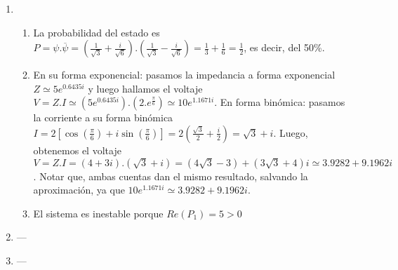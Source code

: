 \documentclass[a4paper]{article}
\newcommand{\exercise}{\item}
\newcommand{\df}[2]{\displaystyle\frac{#1}{#2}}
\newcommand{\conj}[1]{\overline{#1}}
\newcommand{\cis}[1]{\left[\cos\left({#1}\right)+i\sin\left({#1}\right)\right]}
\begin{document}
\begin{enumerate}
\begin{enumerate} [label=(\alph*)]
\item ---		\item Primero rotamos los puntos $90^{\circ}$ en sentido antihorario con la operación $w=z.e^{\frac{\pi}{2}i}=z.i$. Luego expandimos los puntos obtenidos con la operación $u=2.z.i=2i.z$. Los nuevos puntos obtenidos serán $a=-2$, $b=2i-2$, $c=0$ y $d=2i$.
		\item Notar que $Arg(z) = 60^{\circ}$ y queremos rotarlo para que esté orientado hace el eje $-x$, por lo que deberíamos rotarlo $120^{\circ}=\df{2}{3}\pi$. Para rotarlo debemos hacer la operación $w=z.e^{\frac{2\pi}{3}i} = \left(2e^{\frac{\pi}{3}i}\right).e^{\frac{2\pi}{3}i} =2e^{\pi i}=-2+0i$, que está exactamente al centro de la región pedida.
		\item Podemos escalar al complejo con la operación $u=kz=k+4ki$. Si queremos que se cumpla la condición límite $Im(u) = 2 - Re(u)$ debe pasar que $4k=2-k$, es decir, $k=2/5$. Por lo tanto, podremos utilizar valores de $k$ entre $0$ y $\df{2}{5}$. Se sugiere elegir algunos valores de $k$ para escalar al complejo y graficarlo junto con la región pedida.
		\item Notar que $Arg(3+i) \simeq 18.43^{\circ}$ y queremos rotarlo para que esté orientado hace el eje $-x$, por lo que deberíamos rotarlo alrededor de $160^{\circ}=\df{8}{9}\pi$ (no hace falta ser exactos ya que hay toda un área donde el complejo puede caer). Para rotarlo debemos hacer la operación $w=z.e^{\frac{8\pi}{9}i}\simeq \left(\sqrt{10}e^{0.3218 i}\right).e^{\frac{8\pi}{9}i}\simeq \sqrt{10}e^{3.1143 i} \simeq -3.1611 + 0.0864 i$, que gráficamente puede verse que comprueba lo pedido.
\end{enumerate}\exercise\begin{enumerate} [label=(\alph*)]		\item La probabilidad del estado es $P=\psi .\conj{\psi}=\left(\df{1}{\sqrt{3}}+\df{i}{\sqrt{6}}\right).\left(\df{1}{\sqrt{3}}-\df{i}{\sqrt{6}}\right)=\df{1}{3}+\df{1}{6}=\df{1}{2}$, es decir, del 50\%.
		\item En su forma exponencial: pasamos la impedancia a forma exponencial $Z \simeq 5e^{0.6435 i}$ y luego hallamos el voltaje $V=Z.I\simeq\left(5e^{0.6435 i}\right).\left(2.e^{\frac{\pi}{6}}\right)\simeq10e^{1.1671 i}$. En forma binómica: pasamos la corriente a su forma binómica $I=2\cis{\df{\pi}{6}}=2\left(\df{\sqrt{3}}{2}+\df{i}{2}\right)=\sqrt{3}+i$. Luego, obtenemos el voltaje $V=Z.I=(4+3i).(\sqrt{3}+i)=(4\sqrt{3}-3)+(3\sqrt{3}+4)i\simeq 3.9282 + 9.1962 i$. Notar que, ambas cuentas dan el mismo resultado, salvando la aproximación, ya que $10e^{1.1671 i} \simeq 3.9282 + 9.1962 i$.
		\item El sistema es inestable porque $Re(P_1)=5>0$
\end{enumerate}\exercise---\exercise---\end{enumerate}
\end{document}
